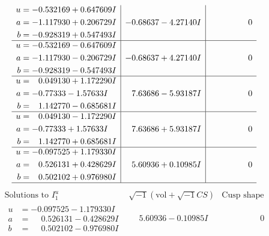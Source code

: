 \documentclass[1p]{elsarticle_modified}
\theoremstyle{definition}
\newcommand{\I}{\sqrt{-1}}
\begin{document}
$$\begin{array}{c|c|c}
\begin{aligned}
u &= -0.532169 + 0.647609 I \\
a &= -1.117930 + 0.206729 I \\
b &= -0.928319 + 0.547493 I\end{aligned}
 & -0.68637 - 4.27140 I & \phantom{-0.000000 } 0 \\ \hline\begin{aligned}
u &= -0.532169 - 0.647609 I \\
a &= -1.117930 - 0.206729 I \\
b &= -0.928319 - 0.547493 I\end{aligned}
 & -0.68637 + 4.27140 I & \phantom{-0.000000 } 0 \\ \hline\begin{aligned}
u &= \phantom{-}0.049130 + 1.172290 I \\
a &= -0.77333 - 1.57633 I \\
b &= \phantom{-}1.142770 - 0.685681 I\end{aligned}
 & \phantom{-}7.63686 - 5.93187 I & \phantom{-0.000000 } 0 \\ \hline\begin{aligned}
u &= \phantom{-}0.049130 - 1.172290 I \\
a &= -0.77333 + 1.57633 I \\
b &= \phantom{-}1.142770 + 0.685681 I\end{aligned}
 & \phantom{-}7.63686 + 5.93187 I & \phantom{-0.000000 } 0 \\ \hline\begin{aligned}
u &= -0.097525 + 1.179330 I \\
a &= \phantom{-}0.526131 + 0.428629 I \\
b &= \phantom{-}0.502102 + 0.976980 I\end{aligned}
 & \phantom{-}5.60936 + 0.10985 I & \phantom{-0.000000 } 0\\
 \hline 
 \end{array}$$\newpage$$\begin{array}{c|c|c}  
\text{Solutions to }I^u_{1}& \I (\text{vol} + \sqrt{-1}CS) & \text{Cusp shape}\\
 \hline 
\begin{aligned}
u &= -0.097525 - 1.179330 I \\
a &= \phantom{-}0.526131 - 0.428629 I \\
b &= \phantom{-}0.502102 - 0.976980 I\end{aligned}
 & \phantom{-}5.60936 - 0.10985 I & \phantom{-0.000000 } 0 \\ \hline\begin{aligned}

\end{aligned}
\end{array}$$
\end{document}
